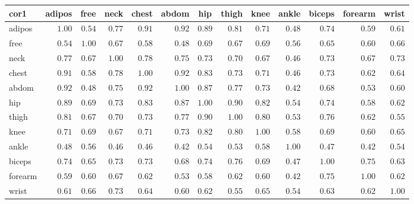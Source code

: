 \begin{table}[!tbp]
\begin{center}
\begin{tabular}{lrrrrrrrrrrrr}
\hline\hline
\multicolumn{1}{l}{cor1}&\multicolumn{1}{c}{adipos}&\multicolumn{1}{c}{free}&\multicolumn{1}{c}{neck}&\multicolumn{1}{c}{chest}&\multicolumn{1}{c}{abdom}&\multicolumn{1}{c}{hip}&\multicolumn{1}{c}{thigh}&\multicolumn{1}{c}{knee}&\multicolumn{1}{c}{ankle}&\multicolumn{1}{c}{biceps}&\multicolumn{1}{c}{forearm}&\multicolumn{1}{c}{wrist}\tabularnewline
\hline
adipos&$1.00$&$0.54$&$0.77$&$0.91$&$0.92$&$0.89$&$0.81$&$0.71$&$0.48$&$0.74$&$0.59$&$0.61$\tabularnewline
free&$0.54$&$1.00$&$0.67$&$0.58$&$0.48$&$0.69$&$0.67$&$0.69$&$0.56$&$0.65$&$0.60$&$0.66$\tabularnewline
neck&$0.77$&$0.67$&$1.00$&$0.78$&$0.75$&$0.73$&$0.70$&$0.67$&$0.46$&$0.73$&$0.67$&$0.73$\tabularnewline
chest&$0.91$&$0.58$&$0.78$&$1.00$&$0.92$&$0.83$&$0.73$&$0.71$&$0.46$&$0.73$&$0.62$&$0.64$\tabularnewline
abdom&$0.92$&$0.48$&$0.75$&$0.92$&$1.00$&$0.87$&$0.77$&$0.73$&$0.42$&$0.68$&$0.53$&$0.60$\tabularnewline
hip&$0.89$&$0.69$&$0.73$&$0.83$&$0.87$&$1.00$&$0.90$&$0.82$&$0.54$&$0.74$&$0.58$&$0.62$\tabularnewline
thigh&$0.81$&$0.67$&$0.70$&$0.73$&$0.77$&$0.90$&$1.00$&$0.80$&$0.53$&$0.76$&$0.62$&$0.55$\tabularnewline
knee&$0.71$&$0.69$&$0.67$&$0.71$&$0.73$&$0.82$&$0.80$&$1.00$&$0.58$&$0.69$&$0.60$&$0.65$\tabularnewline
ankle&$0.48$&$0.56$&$0.46$&$0.46$&$0.42$&$0.54$&$0.53$&$0.58$&$1.00$&$0.47$&$0.42$&$0.54$\tabularnewline
biceps&$0.74$&$0.65$&$0.73$&$0.73$&$0.68$&$0.74$&$0.76$&$0.69$&$0.47$&$1.00$&$0.75$&$0.63$\tabularnewline
forearm&$0.59$&$0.60$&$0.67$&$0.62$&$0.53$&$0.58$&$0.62$&$0.60$&$0.42$&$0.75$&$1.00$&$0.62$\tabularnewline
wrist&$0.61$&$0.66$&$0.73$&$0.64$&$0.60$&$0.62$&$0.55$&$0.65$&$0.54$&$0.63$&$0.62$&$1.00$\tabularnewline
\hline
\end{tabular}\end{center}
\end{table}
